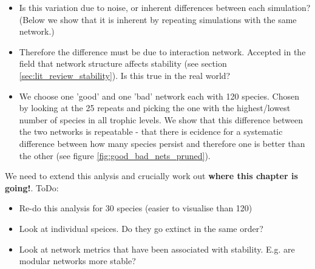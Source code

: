 \begin{itemize}
	\item Is this variation due to noise, or inherent differences between each simulation? (Below we show that it is inherent by repeating simulations with the same network.)

	\item Therefore the difference must be due to interaction network. Accepted in the field that network structure affects stability (see section \ref{sec:lit_review_stability}). Is this true in the real world?
	
	\item We choose one 'good' and one 'bad' network each with 120 species. Chosen by looking at the 25 repeats and picking the one with the highest/lowest number of species in all trophic levels. We show that this difference between the two networks is repeatable - that there is ecidence for a systematic difference between how many species persist and therefore one is better than the other (see figure \ref{fig:good_bad_nets_pruned}).
	
\end{itemize}

We need to extend this anlysis and crucially work out \textbf{where this chapter is going!}. ToDo:

\begin{itemize}
	\item Re-do this analysis for 30 species (easier to visualise than 120)

	\item Look at individual speices. Do they go extinct in the same order?
	
	\item Look at network metrics that have been associated with stability. E.g. are modular networks more stable?

\end{itemize}

